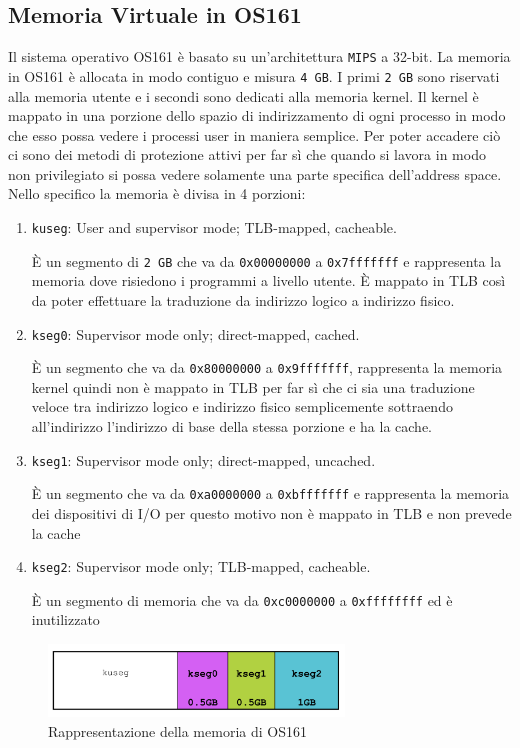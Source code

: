 \subsection{Memoria Virtuale in OS161}
Il sistema operativo OS161 è basato su un'architettura \lstinline{MIPS} a 32-bit.
La memoria in OS161 è allocata in modo contiguo e misura \lstinline{4 GB}. I primi \lstinline{2 GB} sono riservati alla memoria utente e i secondi sono dedicati alla memoria kernel. Il kernel è mappato in una porzione dello spazio di indirizzamento di ogni processo in modo che esso possa vedere i processi user in maniera semplice. Per poter accadere ciò ci sono dei metodi di protezione attivi per far sì che quando si lavora in modo non privilegiato si possa vedere solamente una parte specifica dell'address space.
Nello specifico la memoria è divisa in 4 porzioni:
\begin{enumerate}
   \item \lstinline{kuseg}: User and supervisor mode; TLB-mapped, cacheable. 
   
   È un segmento di \lstinline{2 GB} che va da \lstinline{0x00000000} a \lstinline{0x7fffffff} e rappresenta la memoria dove risiedono i programmi a livello utente. È mappato in TLB così da poter effettuare la traduzione da indirizzo logico a indirizzo fisico.
    \item \lstinline{kseg0}: Supervisor mode only; direct-mapped, cached.

    È un segmento che va da \lstinline{0x80000000} a \lstinline{0x9fffffff},  rappresenta la memoria kernel quindi non è mappato in TLB per far sì che ci sia una traduzione veloce tra indirizzo logico e indirizzo fisico semplicemente sottraendo all'indirizzo l'indirizzo di base della stessa porzione e ha la cache.
    \item \lstinline{kseg1}: Supervisor mode only; direct-mapped, uncached.

    È un segmento che va da \lstinline{0xa0000000} a \lstinline{0xbfffffff} e rappresenta la memoria dei dispositivi di I/O per questo motivo non è mappato in TLB e non prevede la cache 
    \item \lstinline{kseg2}: Supervisor mode only; TLB-mapped, cacheable.

    È un segmento di memoria che va da \lstinline{0xc0000000} a \lstinline{0xffffffff} ed è inutilizzato 
\end{enumerate}

\begin{figure}[hbt!]
    \centering
    \includegraphics[width=0.7\textwidth]{Memoria Virtuale/images/kernel memory os161.png}
    \caption{Rappresentazione della memoria di OS161}
    \label{kmemos161}
\end{figure}

